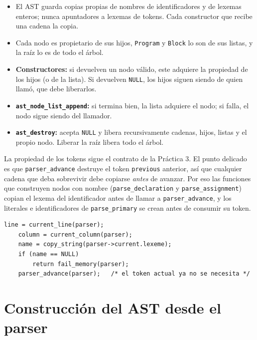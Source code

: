 \documentclass[12pt,letterpaper]{article}
\begin{document}
\begin{itemize}
\item El AST guarda copias propias de nombres de identificadores y de lexemas enteros; nunca apuntadores a
  lexemas de tokens. Cada constructor que recibe una cadena la copia.
\item Cada nodo es propietario de sus hijos, \texttt{Program} y \texttt{Block} lo son de sus listas, y la
  raíz lo es de todo el árbol.
\item \textbf{Constructores:} si devuelven un nodo válido, este adquiere la propiedad de los hijos (o de la
  lista). Si devuelven \texttt{NULL}, los hijos siguen siendo de quien llamó, que debe liberarlos.
\item \textbf{\texttt{ast\_node\_list\_append}:} si termina bien, la lista adquiere el nodo; si falla, el nodo
  sigue siendo del llamador.
\item \textbf{\texttt{ast\_destroy}:} acepta \texttt{NULL} y libera recursivamente cadenas, hijos, listas y el
  propio nodo. Liberar la raíz libera todo el árbol.
\end{itemize}

La propiedad de los tokens sigue el contrato de la Práctica 3. El punto delicado es que
\texttt{parser\_advance} destruye el token \texttt{previous} anterior, así que cualquier cadena que deba
sobrevivir debe copiarse \emph{antes} de avanzar. Por eso las funciones que construyen nodos con nombre
(\texttt{parse\_declaration} y \texttt{parse\_assignment}) copian el lexema del identificador antes de
llamar a \texttt{parser\_advance}, y los literales e identificadores de \texttt{parse\_primary} se crean antes
de consumir su token.

\begin{lstlisting}[style=modernc, caption={Copia del nombre antes de avanzar en \texttt{parse\_declaration}.}]
    line = current_line(parser);
    column = current_column(parser);
    name = copy_string(parser->current.lexeme);
    if (name == NULL)
        return fail_memory(parser);
    parser_advance(parser);   /* el token actual ya no se necesita */
\end{lstlisting}


\section*{Construcción del AST desde el parser}
\end{document}
